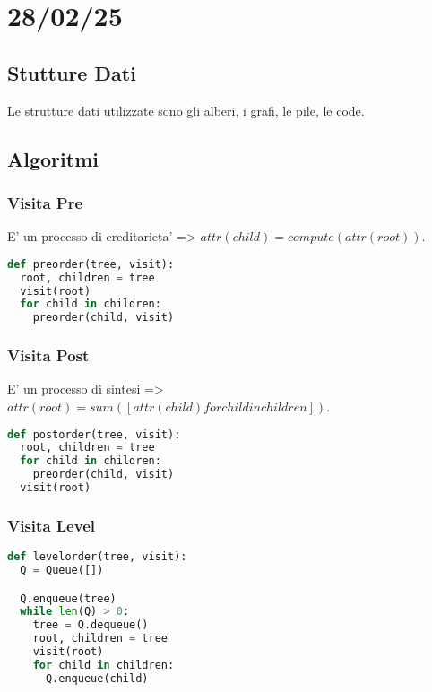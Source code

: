 \chapter{28/02/25}

\section{Stutture Dati}

Le strutture dati utilizzate sono gli alberi, i grafi, le pile, le code.

\section{Algoritmi}

\subsection{Visita Pre}

E' un processo di ereditarieta' => $attr(child) = compute(attr(root))$.

\begin{lstlisting}[language=Python]
def preorder(tree, visit):
  root, children = tree
  visit(root)
  for child in children:
    preorder(child, visit)
\end{lstlisting}

\subsection{Visita Post}

E' un processo di sintesi => $attr(root) = sum([attr(child) for child in children])$.

\begin{lstlisting}[language=Python]
def postorder(tree, visit):
  root, children = tree
  for child in children:
    preorder(child, visit)
  visit(root)
\end{lstlisting}

\subsection{Visita Level}

\begin{lstlisting}[language=Python]
def levelorder(tree, visit):
  Q = Queue([])

  Q.enqueue(tree)
  while len(Q) > 0:
    tree = Q.dequeue()
    root, children = tree
    visit(root)
    for child in children:
      Q.enqueue(child)
\end{lstlisting}

